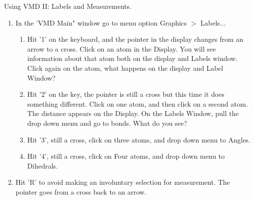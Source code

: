 \documentclass{beamer}
\begin{document}
\begin{frame}[shrink=10]{Using VMD II: Labels and Measurements.}
   \begin{enumerate}
      \item In the 'VMD Main" window go to menu option Graphics $>$ Labels...
      \begin{enumerate}
          \item Hit '1' on the keyboard, and the pointer in the display changes from an arrow to a cross. Click on an atom in the Display. 
            You will see information about that atom both on the display and Labels window. Click again on the atom, what happens on the display
            and Label Window?
          \item Hit '2' on the key, the pointer is still a cross but this time it does something different. Click on one atom, and then click on 
                a second atom. The distance appears on the Display. On the Labels Window, pull the drop down menu and go to bonds. What do you see?
          \item Hit '3', still a cross, click on three atoms, and drop down menu to Angles. 
          \item Hit '4', still a cross, click on Four atoms, and drop down menu to Dihedrals.
      \end{enumerate}
      \item Hit 'R' to avoid making an involuntary selection for measurement. The pointer goes from a cross back to an arrow. 
   \end{enumerate}
\end{frame}
\end{document}
